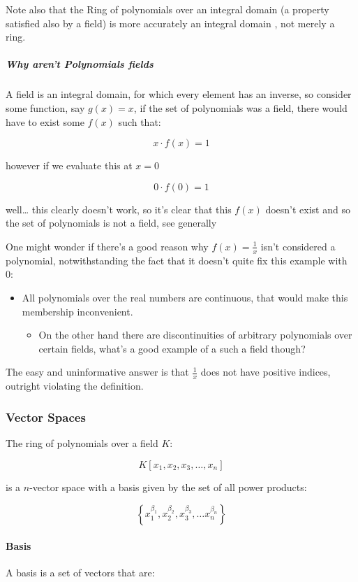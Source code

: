 \documentclass[a4paper,11pt,twoside]{article}
\begin{document}
Note also that the Ring of polynomials over an integral domain (a
property satisfied also by a field) is more accurately an
integral domain
\cite{sympydevelopmentteamBasicFunctionalityModule,RingPolynomialForms},
not merely a ring.
\subparagraph{Why aren't Polynomials fields}
\label{sec:org10f8f7d}
A field is an integral domain, for which every element has an
inverse, so consider some function, say \(g(x)=x\), if the set of polynomials
was a field, there would have to exist some \(f(x)\) such that:

\[
      x \cdot f(x) = 1
      \]

however if we evaluate this at \(x=0\)

\[
      0 \cdot f(0) = 1
      \]

well\ldots{} this clearly doesn't work, so it's clear that this \(f(x)\)
doesn't exist and so the set of polynomials is not a field, see
generally \cite{billdubuqueAbstractAlgebraWhy}

One might wonder if there's a good reason why \(f(x)=\frac{1}{x}\)
isn't considered a polynomial, notwithstanding the fact that it
doesn't quite fix this example with 0:

\begin{itemize}
\item All polynomials over the real numbers are continuous, that
would make this membership inconvenient.
\begin{itemize}
\item On the other hand there are discontinuities of arbitrary
polynomials over certain fields, what's a good example of
a such a field though?
\end{itemize}
\end{itemize}


The easy and uninformative answer is that \(\frac{1}{x}\) does
not have positive indices, outright violating the definition.

\subsubsection{Vector Spaces}
\label{sec:org2deffe5}
The ring of polynomials over a field \(K\):

\[
    K\left[x_1, x_2, x_3, \ldots, x_n\right]
    \]

is a \(n\)-vector space with a basis given by the set of all power products:

\[
    \left\{x_1^{\beta_1}, x_2^{\beta_2}, x_3^{\beta_3}, \ldots x_n^{\beta_n} \right\}
    \]
\paragraph{Basis}
\label{sec:org96a632c}
A basis is a set of vectors that
\cite[p. 39]{axlerLinearAlgebraDone2014} are:
\end{document}
